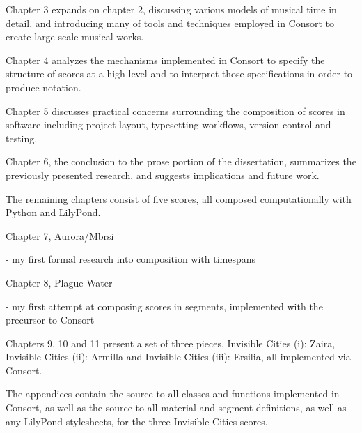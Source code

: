 \begin{markdown}
Chapter 3 expands on chapter 2, discussing various models of musical time in
detail, and introducing many of tools and techniques employed in Consort to
create large-scale musical works.

Chapter 4 analyzes the mechanisms implemented in Consort to specify the
structure of scores at a high level and to interpret those specifications in
order to produce notation.

Chapter 5 discusses practical concerns surrounding the composition of scores in
software including project layout, typesetting workflows, version control and
testing.

Chapter 6, the conclusion to the prose portion of the dissertation, summarizes
the previously presented research, and suggests implications and future work.

The remaining chapters consist of five scores, all composed computationally
with Python and LilyPond.

Chapter 7, Aurora/Mbrsi

- my first formal research into composition with timespans

Chapter 8, Plague Water

- my first attempt at composing scores in segments, implemented with the
precursor to Consort

Chapters 9, 10 and 11 present a set of three pieces, Invisible Cities (i):
Zaira, Invisible Cities (ii): Armilla and Invisible Cities (iii): Ersilia, all
implemented via Consort.

The appendices contain the source to all classes and functions implemented in
Consort, as well as the source to all material and segment definitions, as well
as any LilyPond stylesheets, for the three Invisible Cities scores.

\end{markdown}
